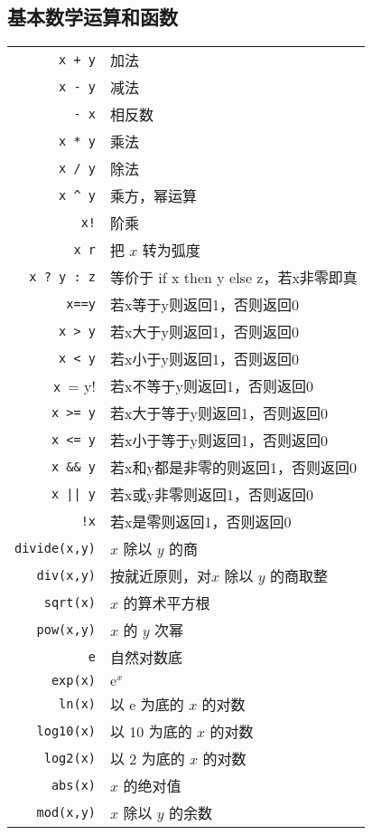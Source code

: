 \documentclass[UTF8]{ctexart}
\begin{document}
\subsection{基本数学运算和函数}

\begin{longtable}{r|l}
\hline
\endfirsthead
\hline
\endhead
\hline
\endfoot
\hline
\endfoot
\verb!x + y! & 加法\\
\verb!x - y! & 减法\\
\verb!- x! & 相反数\\
\verb!x * y! & 乘法\\
\verb!x / y! & 除法\\
\verb!x ^ y! & 乘方，幂运算\\
\verb=x!= & 阶乘\\
\verb=x r= & 把 $x$ 转为弧度\\
\verb=x ? y : z= & 等价于 if x then y else z，若x非零即真\\
\verb!x==y! & 若x等于y则返回1，否则返回0\\
\verb!x > y! & 若x大于y则返回1，否则返回0\\
\verb!x < y! & 若x小于y则返回1，否则返回0\\
\verb!x != y! & 若x不等于y则返回1，否则返回0\\
\verb!x >= y! & 若x大于等于y则返回1，否则返回0\\
\verb!x <= y! & 若x小于等于y则返回1，否则返回0\\
\verb!x && y! & 若x和y都是非零的则返回1，否则返回0\\
\verb!x || y! & 若x或y非零则返回1，否则返回0\\
\verb=!x= & 若x是零则返回1，否则返回0\\
\verb=divide(x,y)= & $x$ 除以 $y$ 的商\\
\verb=div(x,y)= & 按就近原则，对$x$ 除以 $y$ 的商取整\\
\verb=sqrt(x)= & $x$ 的算术平方根\\
\verb=pow(x,y)= & $x$ 的 $y$ 次幂\\
\verb=e= & 自然对数底\\
\verb=exp(x)= & $\mathrm{e}^x$\\
\verb=ln(x)= & 以  $\mathrm{e}$ 为底的 $x$ 的对数\\
\verb=log10(x)= & 以 10 为底的 $x$ 的对数\\
\verb=log2(x)= & 以 2 为底的 $x$ 的对数\\
\verb=abs(x)= & $x$ 的绝对值\\
\verb=mod(x,y)= & $x$ 除以 $y$ 的余数\\

\end{longtable}
\end{document}

